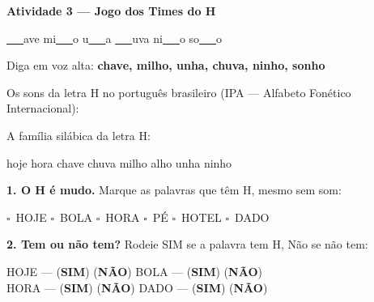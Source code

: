 \begin{consolidacao}
\textbf{Atividade 3 --- Jogo dos Times do H}


\begin{center}
\underline{~~~}ave \quad mi\underline{~~~}o \quad u\underline{~~~}a \quad \underline{~~~}uva \quad ni\underline{~~~}o \quad so\underline{~~~}o
\end{center}
Diga em voz alta: \textbf{chave, milho, unha, chuva, ninho, sonho}

\end{consolidacao}


\begin{sonsdaletra}
Os sons da letra H no portugu\^es{} brasileiro (IPA --- Alfabeto Fon\'etico Internacional):

\end{sonsdaletra}


\begin{familiasilabica}
A fam\'ilia sil\'abica da letra H:

\begin{center}
hoje \quad hora \quad chave \quad chuva \quad milho \quad alho \quad unha \quad ninho
\end{center}
\end{familiasilabica}


\begin{somletra}
\textbf{1. O H \'e{} mudo.} Marque as palavras que t\^e{}m H, mesmo sem som:
\begin{center}
$\square$~HOJE \quad $\square$~BOLA \quad $\square$~HORA \quad $\square$~P\'E \quad $\square$~HOTEL \quad $\square$~DADO
\end{center}

\textbf{2. Tem ou n\~ao{} tem?} Rodeie SIM se a palavra tem H, N\~ao{} se n\~ao{} tem:
\begin{center}
HOJE --- (\textbf{SIM}) (\textbf{N\~AO}) \quad BOLA --- (\textbf{SIM}) (\textbf{N\~AO})\\
HORA --- (\textbf{SIM}) (\textbf{N\~AO}) \quad DADO --- (\textbf{SIM}) (\textbf{N\~AO})
\end{center}
\end{somletra}

